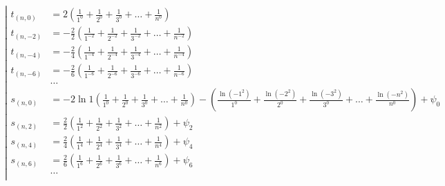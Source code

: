 \begin{equation*} \left| \begin{aligned}
t_{(n,0)} &=
  2
  \left(
  \frac{1}{1^0}
+ \frac{1}{2^0}
+ \frac{1}{3^0}
+ \ldots
+ \frac{1}{n^0}
  \right) \\
%
t_{(n,-2)} &=
- \frac{2}{2}
  \left(
  \frac{1}{1^{-2}}
+ \frac{1}{2^{-2}}
+ \frac{1}{3^{-2}}
+ \ldots
+ \frac{1}{n^{-2}}
  \right) \\
%
t_{(n,-4)} &=
- \frac{2}{4}
  \left(
  \frac{1}{1^{-4}}
+ \frac{1}{2^{-4}}
+ \frac{1}{3^{-4}}
+ \ldots
+ \frac{1}{n^{-4}}
  \right) \\
%
t_{(n,-6)} &=
- \frac{2}{6}
  \left(
  \frac{1}{1^{-6}}
+ \frac{1}{2^{-6}}
+ \frac{1}{3^{-6}}
+ \ldots
+ \frac{1}{n^{-6}}
  \right) \\
%
&\ldots \\
%
s_{(n,0)} &=
- 2 \ln{1}
  \left(
  \frac{1}{1^0}
+ \frac{1}{2^0}
+ \frac{1}{3^0}
+ \ldots
+ \frac{1}{n^0}
  \right)
- \left(
  \frac{\ln{(- 1^2)}}{1^0}
+ \frac{\ln{(- 2^2)}}{2^0}
+ \frac{\ln{(- 3^2)}}{3^0}
+ \ldots
+ \frac{\ln{(- n^2)}}{n^0}
  \right)
+ \psi_0 \\
%
s_{(n,2)} &=
  \frac{2}{2}
  \left(
  \frac{1}{1^2}
+ \frac{1}{2^2}
+ \frac{1}{3^2}
+ \ldots
+ \frac{1}{n^2}
  \right)
+ \psi_2 \\
%
s_{(n,4)} &=
  \frac{2}{4}
  \left(
  \frac{1}{1^4}
+ \frac{1}{2^4}
+ \frac{1}{3^4}
+ \ldots
+ \frac{1}{n^4}
  \right)
+ \psi_4 \\
%
s_{(n,6)} &=
  \frac{2}{6}
  \left(
  \frac{1}{1^6}
+ \frac{1}{2^6}
+ \frac{1}{3^6}
+ \ldots
+ \frac{1}{n^6}
  \right)
+ \psi_6 \\
%
&\ldots \\
\end{aligned} \right. \end{equation*}